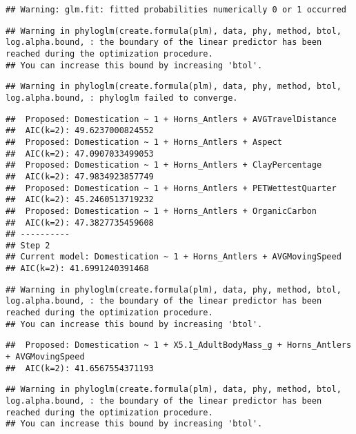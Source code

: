 \documentclass[
]{article}
\begin{document}
\begin{verbatim}
## Warning: glm.fit: fitted probabilities numerically 0 or 1 occurred
\end{verbatim}

\begin{verbatim}
## Warning in phyloglm(create.formula(plm), data, phy, method, btol, log.alpha.bound, : the boundary of the linear predictor has been reached during the optimization procedure.
## You can increase this bound by increasing 'btol'.
\end{verbatim}

\begin{verbatim}
## Warning in phyloglm(create.formula(plm), data, phy, method, btol, log.alpha.bound, : phyloglm failed to converge.
\end{verbatim}

\begin{verbatim}
##  Proposed: Domestication ~ 1 + Horns_Antlers + AVGTravelDistance
##  AIC(k=2): 49.6237000824552
##  Proposed: Domestication ~ 1 + Horns_Antlers + Aspect
##  AIC(k=2): 47.0907033499053
##  Proposed: Domestication ~ 1 + Horns_Antlers + ClayPercentage
##  AIC(k=2): 47.9834923857749
##  Proposed: Domestication ~ 1 + Horns_Antlers + PETWettestQuarter
##  AIC(k=2): 45.2460513719232
##  Proposed: Domestication ~ 1 + Horns_Antlers + OrganicCarbon
##  AIC(k=2): 47.3827735459608
## ----------
## Step 2
## Current model: Domestication ~ 1 + Horns_Antlers + AVGMovingSpeed
## AIC(k=2): 41.6991240391468
\end{verbatim}

\begin{verbatim}
## Warning in phyloglm(create.formula(plm), data, phy, method, btol, log.alpha.bound, : the boundary of the linear predictor has been reached during the optimization procedure.
## You can increase this bound by increasing 'btol'.
\end{verbatim}

\begin{verbatim}
##  Proposed: Domestication ~ 1 + X5.1_AdultBodyMass_g + Horns_Antlers + AVGMovingSpeed
##  AIC(k=2): 41.6567554371193
\end{verbatim}

\begin{verbatim}
## Warning in phyloglm(create.formula(plm), data, phy, method, btol, log.alpha.bound, : the boundary of the linear predictor has been reached during the optimization procedure.
## You can increase this bound by increasing 'btol'.
\end{verbatim}
\end{document}
